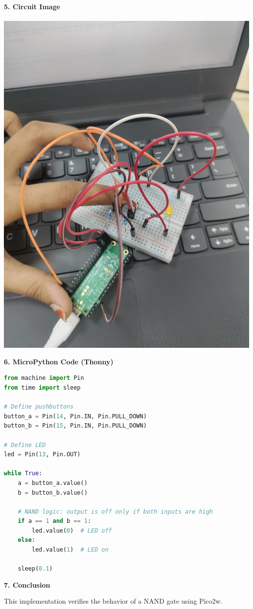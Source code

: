 \documentclass[12pt]{article}
\begin{document}
\vspace{19em}
\textbf{5. Circuit Image}\\ 
\\
\includegraphics[width=0.6\linewidth]{output.jpeg} 

\vspace{1em}
\noindent\textbf{6. MicroPython Code (Thonny)}
\begin{lstlisting}[language=Python]
from machine import Pin
from time import sleep

# Define pushbuttons
button_a = Pin(14, Pin.IN, Pin.PULL_DOWN)
button_b = Pin(15, Pin.IN, Pin.PULL_DOWN)

# Define LED
led = Pin(13, Pin.OUT)

while True:
    a = button_a.value()
    b = button_b.value()

    # NAND logic: output is off only if both inputs are high
    if a == 1 and b == 1:
        led.value(0)  # LED off
    else:
        led.value(1)  # LED on

    sleep(0.1)
\end{lstlisting}
\vspace{1em}
\noindent\textbf{7. Conclusion}

This implementation verifies the behavior of a NAND gate using  Pico2w. 
\end{document}
